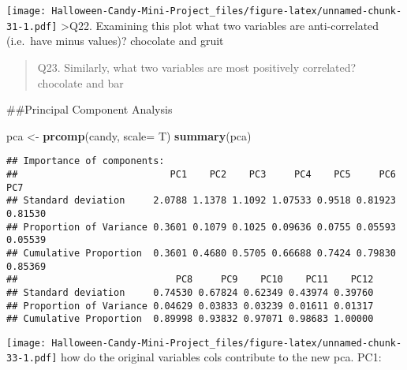 \documentclass[
]{article}
\newenvironment{Shaded}{\begin{snugshade}}{\end{snugshade}}
\newcommand{\AttributeTok}[1]{\textcolor[rgb]{0.13,0.29,0.53}{#1}}
\newcommand{\DecValTok}[1]{\textcolor[rgb]{0.00,0.00,0.81}{#1}}
\newcommand{\FunctionTok}[1]{\textcolor[rgb]{0.13,0.29,0.53}{\textbf{#1}}}
\newcommand{\NormalTok}[1]{#1}
\newcommand{\OtherTok}[1]{\textcolor[rgb]{0.56,0.35,0.01}{#1}}
\newcommand{\SpecialCharTok}[1]{\textcolor[rgb]{0.81,0.36,0.00}{\textbf{#1}}}
\newcommand{\StringTok}[1]{\textcolor[rgb]{0.31,0.60,0.02}{#1}}
\begin{document}
\texttt{[image: Halloween-Candy-Mini-Project\_files/figure-latex/unnamed-chunk-31-1.pdf]}
\textgreater Q22. Examining this plot what two variables are
anti-correlated (i.e.~have minus values)? chocolate and gruit

\begin{quote}
Q23. Similarly, what two variables are most positively correlated?
chocolate and bar
\end{quote}

\#\#Principal Component Analysis

\begin{Shaded}
\begin{Highlighting}[]
\NormalTok{pca }\OtherTok{\textless{}{-}} \FunctionTok{prcomp}\NormalTok{(candy, }\AttributeTok{scale=}\NormalTok{ T)}
\FunctionTok{summary}\NormalTok{(pca)}
\end{Highlighting}
\end{Shaded}

\begin{verbatim}
## Importance of components:
##                           PC1    PC2    PC3     PC4    PC5     PC6     PC7
## Standard deviation     2.0788 1.1378 1.1092 1.07533 0.9518 0.81923 0.81530
## Proportion of Variance 0.3601 0.1079 0.1025 0.09636 0.0755 0.05593 0.05539
## Cumulative Proportion  0.3601 0.4680 0.5705 0.66688 0.7424 0.79830 0.85369
##                            PC8     PC9    PC10    PC11    PC12
## Standard deviation     0.74530 0.67824 0.62349 0.43974 0.39760
## Proportion of Variance 0.04629 0.03833 0.03239 0.01611 0.01317
## Cumulative Proportion  0.89998 0.93832 0.97071 0.98683 1.00000
\end{verbatim}

\begin{Shaded}
\end{Shaded}

\texttt{[image: Halloween-Candy-Mini-Project\_files/figure-latex/unnamed-chunk-33-1.pdf]}
how do the original variables cols contribute to the new pca. PC1:

\begin{Shaded}
\end{Shaded}
\end{document}
